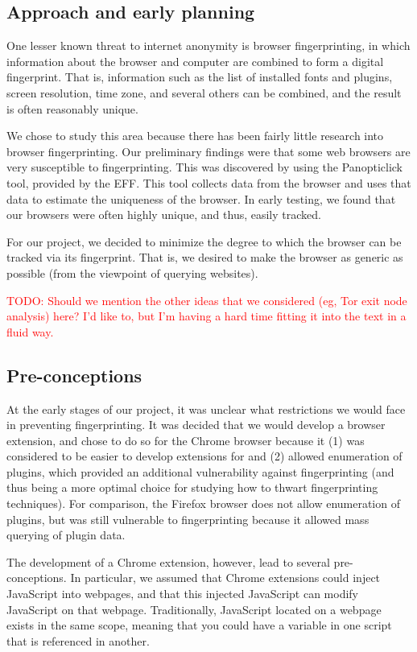 \documentclass[12pt,a4paper]{article}
\begin{document}
\subsection{Approach and early planning}
One lesser known threat to internet anonymity is browser fingerprinting, in which information about the browser and computer are combined to form a digital fingerprint. That is, information such as the list of installed fonts and plugins, screen resolution, time zone, and several others can be combined, and the result is often reasonably unique.

We chose to study this area because there has been fairly little research into browser fingerprinting. Our preliminary findings were that some web browsers are very susceptible to fingerprinting. This was discovered by using the Panopticlick\cite{panopticlick} tool, provided by the EFF. This tool collects data from the browser and uses that data to estimate the uniqueness of the browser. In early testing, we found that our browsers were often highly unique, and thus, easily tracked.

For our project, we decided to minimize the degree to which the browser can be tracked via its fingerprint. That is, we desired to make the browser as generic as possible (from the viewpoint of querying websites).

\textcolor{red}{TODO: Should we mention the other ideas that we considered (eg, Tor exit node analysis) here? I'd like to, but I'm having a hard time fitting it into the text in a fluid way.}

\subsection{Pre-conceptions}
At the early stages of our project, it was unclear what restrictions we would face in preventing fingerprinting. It was decided that we would develop a browser extension, and chose to do so for the Chrome browser because it (1) was considered to be easier to develop extensions for and (2) allowed enumeration of plugins, which provided an additional vulnerability against fingerprinting (and thus being a more optimal choice for studying how to thwart fingerprinting techniques). For comparison, the Firefox browser does not allow enumeration of plugins, but was still vulnerable to fingerprinting because it allowed mass querying of plugin data.

The development of a Chrome extension, however, lead to several pre-conceptions. In particular, we assumed that Chrome extensions could inject JavaScript into webpages, and that this injected JavaScript can modify JavaScript on that webpage. Traditionally, JavaScript located on a webpage exists in the same scope, meaning that you could have a variable in one script that is referenced in another.
\end{document}
